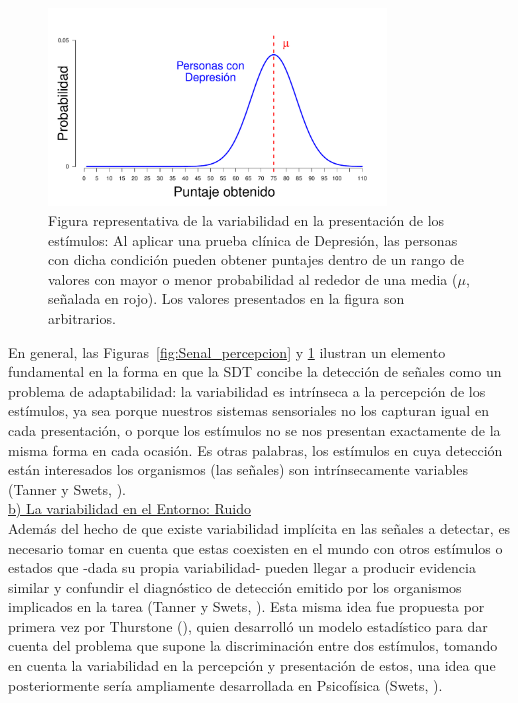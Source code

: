 \begin{figure}[th]
\centering
\includegraphics[width=0.80\textwidth]{Figures/Signal_Presentation} 
\caption[Variabilidad en la presentación de los estímulos]{Figura representativa de la variabilidad en la presentación de los estímulos: Al aplicar una prueba clínica de Depresión, las personas con dicha condición pueden obtener puntajes dentro de un rango de valores con mayor o menor probabilidad al rededor de una media ($\mu$, señalada en rojo). Los valores presentados en la figura son arbitrarios.}
\label{fig:Senal_presentacion}
\end{figure}


En general, las Figuras~\ref{fig:Senal_percepcion} y \ref{fig:Senal_presentacion} ilustran un elemento fundamental en la forma en que la SDT concibe la detección de señales como un problema de adaptabilidad: la variabilidad es intrínseca a la percepción de los estímulos, ya sea porque nuestros sistemas sensoriales no los capturan igual en cada presentación, o porque los estímulos no se nos presentan exactamente de la misma forma en cada ocasión. Es otras palabras, los estímulos en cuya detección están interesados los organismos (las señales) son intrínsecamente variables (Tanner y Swets, \citeyear{Tanner1954}).\\

    \underline{b) La variabilidad en el Entorno: Ruido}\\

Además del hecho de que existe variabilidad implícita en las señales a detectar, es necesario tomar en cuenta que estas coexisten en el mundo con otros estímulos o estados que -dada su propia variabilidad- pueden llegar a producir evidencia similar y confundir el diagnóstico de detección emitido por los organismos implicados en la tarea (Tanner y Swets, \citeyear{Tanner1954}). Esta misma idea fue propuesta por primera vez por Thurstone (\citeyear{Thurstone1927}), quien desarrolló un modelo estadístico para dar cuenta del problema que supone la discriminación entre dos estímulos, tomando en cuenta la variabilidad en la percepción y presentación de estos, una idea que posteriormente sería ampliamente desarrollada en Psicofísica (Swets, \citeyear{Swets1973}).\\

